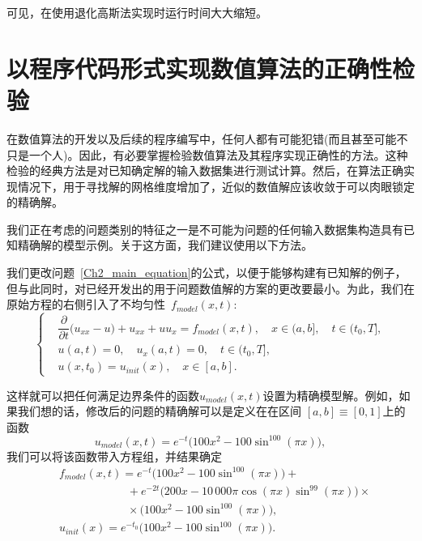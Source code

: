 \documentclass[twoside]{book}
\begin{document}
\begin{CJK*}{GBK}{song}
可见，在使用退化高斯法实现时运行时间大大缩短。




\section{以程序代码形式实现数值算法的正确性检验}

	在数值算法的开发以及后续的程序编写中，任何人都有可能犯错(而且甚至可能不只是一个人)。因此，有必要掌握检验数值算法及其程序实现正确性的方法。这种检验的经典方法是对已知确定解的输入数据集进行测试计算。然后，在算法正确实现情况下，用于寻找解的网格维度增加了，近似的数值解应该收敛于可以肉眼锁定的精确解。

	我们正在考虑的问题类别的特征之一是不可能为问题的任何输入数据集构造具有已知精确解的模型示例。关于这方面，我们建议使用以下方法。
	
	我们更改问题~\eqref{Ch2_main_equation}的公式，以便于能够构建有已知解的例子，但与此同时，对已经开发出的用于问题数值解的方案的更改要最小。为此，我们在原始方程的右侧引入了不均匀性~$f_{model}(x,t)$:
	\begin{equation*}
		\left\{
		\begin{aligned}
			&\dfrac{\partial}{\partial t} \big(u_{xx} - u\big) + u_{xx} + u u_x = f_{model}(x,t), \quad x \in (a,b], \quad t \in (t_0,T], \\
			&u(a,t) = 0, \quad u_x(a,t) = 0, \quad t \in (t_0,T], \\
			&u(x,t_0) = u_{init}(x), \quad x \in [a,b].
		\end{aligned}
		\right.
	\end{equation*}

	这样就可以把任何满足边界条件的函数$u_{model}(x,t)$设置为精确模型解。例如，如果我们想的话，修改后的问题的精确解可以是定义在在区间 $[a,b] \equiv [0,1]$上的函数
	\begin{equation*}
		u_{model}(x,t) = e^{-t}\big(100x^2 - 100\sin^{100}(\pi x)\big),
	\end{equation*}
	我们可以将该函数带入方程组，并结果确定
	\begin{align*}
		&f_{model}(x,t) = e^{-t}\big(100x^2 - 100\sin^{100}(\pi x)\big) +{} \\
		&\qquad\qquad\qquad + e^{-2t}(200x - 10\,000 \pi \cos(\pi x) \sin^{99}(\pi x)\big) \times {}\\
		&\qquad\qquad\qquad \times \big(100x^2 - 100\sin^{100}(\pi x)\big),\\
	&u_{init}(x) = e^{-t_0}\big(100x^2 - 100\sin^{100}(\pi x)\big).
	\end{align*}


\end{CJK*}
\end{document}
